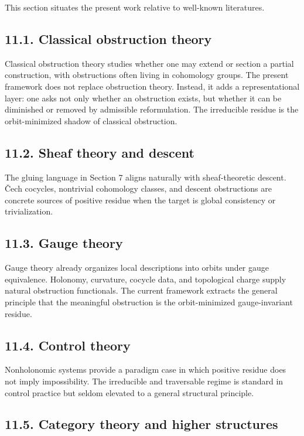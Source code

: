 \documentclass[
]{article}
\begin{document}
This section situates the present work relative to well-known
literatures.

\subsection{11.1. Classical obstruction
theory}\label{classical-obstruction-theory}

Classical obstruction theory studies whether one may extend or section a
partial construction, with obstructions often living in cohomology
groups. The present framework does not replace obstruction theory.
Instead, it adds a representational layer: one asks not only whether an
obstruction exists, but whether it can be diminished or removed by
admissible reformulation. The irreducible residue is the orbit-minimized
shadow of classical obstruction.

\subsection{11.2. Sheaf theory and
descent}\label{sheaf-theory-and-descent}

The gluing language in Section 7 aligns naturally with sheaf-theoretic
descent. Čech cocycles, nontrivial cohomology classes, and descent
obstructions are concrete sources of positive residue when the target is
global consistency or trivialization.

\subsection{11.3. Gauge theory}\label{gauge-theory}

Gauge theory already organizes local descriptions into orbits under
gauge equivalence. Holonomy, curvature, cocycle data, and topological
charge supply natural obstruction functionals. The current framework
extracts the general principle that the meaningful obstruction is the
orbit-minimized gauge-invariant residue.

\subsection{11.4. Control theory}\label{control-theory}

Nonholonomic systems provide a paradigm case in which positive residue
does not imply impossibility. The irreducible and traversable regime is
standard in control practice but seldom elevated to a general structural
principle.

\subsection{11.5. Category theory and higher
structures}\label{category-theory-and-higher-structures}
\end{document}

